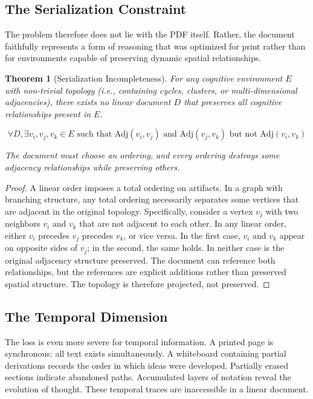 \documentclass[12pt,oneside]{article}
\newtheorem{theorem}[definition]{Theorem}
\theoremstyle{remark}
\begin{document}
\subsection{The Serialization Constraint}

The problem therefore does not lie with the PDF itself. Rather, the document faithfully represents a form of reasoning that was optimized for print rather than for environments capable of preserving dynamic spatial relationships.

\begin{theorem}[Serialization Incompleteness]
For any cognitive environment $E$ with non-trivial topology (i.e., containing cycles, clusters, or multi-dimensional adjacencies), there exists no linear document $D$ that preserves all cognitive relationships present in $E$.

\begin{equation}
\forall D, \exists v_i, v_j, v_k \in E \text{ such that } \text{Adj}(v_i, v_j) \text{ and } \text{Adj}(v_j, v_k) \text{ but } \text{not Adj}(v_i, v_k)
\end{equation}

The document must choose an ordering, and every ordering destroys some adjacency relationships while preserving others.
\end{theorem}

\begin{proof}
A linear order imposes a total ordering on artifacts. In a graph with branching structure, any total ordering necessarily separates some vertices that are adjacent in the original topology. Specifically, consider a vertex $v_j$ with two neighbors $v_i$ and $v_k$ that are not adjacent to each other. In any linear order, either $v_i$ precedes $v_j$ precedes $v_k$, or vice versa. In the first case, $v_i$ and $v_k$ appear on opposite sides of $v_j$; in the second, the same holds. In neither case is the original adjacency structure preserved. The document can reference both relationships, but the references are explicit additions rather than preserved spatial structure. The topology is therefore projected, not preserved.
\end{proof}

\subsection{The Temporal Dimension}

The loss is even more severe for temporal information. A printed page is synchronous: all text exists simultaneously. A whiteboard containing partial derivations records the order in which ideas were developed. Partially erased sections indicate abandoned paths. Accumulated layers of notation reveal the evolution of thought. These temporal traces are inaccessible in a linear document.
\end{document}
